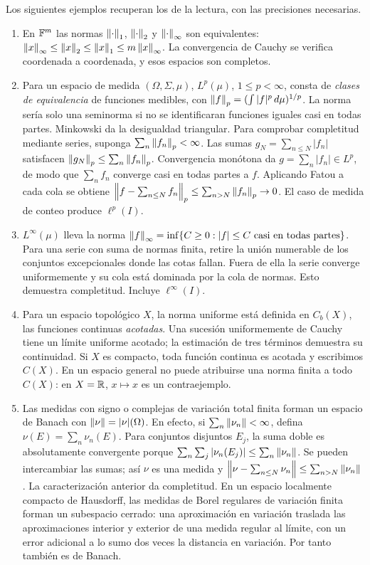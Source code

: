 Los siguientes ejemplos recuperan los de la lectura, con las precisiones necesarias.
\begin{enumerate}
\item En $\mathbb F^m$ las normas $\left\lVert\cdot\right\rVert_1$, $\left\lVert\cdot\right\rVert_2$ y $\left\lVert\cdot\right\rVert_\infty$ son equivalentes: $\left\lVert x\right\rVert_\infty\leq\left\lVert x\right\rVert_2\leq\left\lVert x\right\rVert_1\leq m\left\lVert x\right\rVert_\infty$. La convergencia de Cauchy se verifica coordenada a coordenada, y esos espacios son completos.
\item Para un espacio de medida $(\Omega,\Sigma,\mu)$, $L^p(\mu)$, $1\leq p<\infty$, consta de \emph{clases de equivalencia} de funciones medibles, con $\left\lVert f\right\rVert_p=(\int|f|^p\,d\mu)^{1/p}$. La norma sería solo una seminorma si no se identificaran funciones iguales casi en todas partes. Minkowski da la desigualdad triangular. Para comprobar completitud mediante series, suponga $\sum_n\left\lVert f_n\right\rVert_p<\infty$. Las sumas $g_N=\sum_{n\leq N}|f_n|$ satisfacen $\left\lVert g_N\right\rVert_p\leq\sum_n\left\lVert f_n\right\rVert_p$. Convergencia monótona da $g=\sum_n|f_n|\in L^p$, de modo que $\sum_nf_n$ converge casi en todas partes a $f$. Aplicando Fatou a cada cola se obtiene $\left\lVert f-\sum_{n\leq N}f_n\right\rVert_p\leq\sum_{n>N}\left\lVert f_n\right\rVert_p\to0$. El caso de medida de conteo produce $\ell^p(I)$.
\item $L^\infty(\mu)$ lleva la norma $\left\lVert f\right\rVert_\infty=\inf\{C\geq0:|f|\leq C\text{ casi en todas partes}\}$. Para una serie con suma de normas finita, retire la unión numerable de los conjuntos excepcionales donde las cotas fallan. Fuera de ella la serie converge uniformemente y su cola está dominada por la cola de normas. Esto demuestra completitud. Incluye $\ell^\infty(I)$.
\item Para un espacio topológico $X$, la norma uniforme está definida en $C_b(X)$, las funciones continuas \emph{acotadas}. Una sucesión uniformemente de Cauchy tiene un límite uniforme acotado; la estimación de tres términos demuestra su continuidad. Si $X$ es compacto, toda función continua es acotada y escribimos $C(X)$. En un espacio general no puede atribuirse una norma finita a todo $C(X)$: en $X=\mathbb R$, $x\mapsto x$ es un contraejemplo.
\item Las medidas con signo o complejas de variación total finita forman un espacio de Banach con $\left\lVert\nu\right\rVert=|\nu|(\Omega)$. En efecto, si $\sum_n\left\lVert\nu_n\right\rVert<\infty$, defina $\nu(E)=\sum_n\nu_n(E)$. Para conjuntos disjuntos $E_j$, la suma doble es absolutamente convergente porque $\sum_n\sum_j|\nu_n(E_j)|\leq\sum_n\left\lVert\nu_n\right\rVert$. Se pueden intercambiar las sumas; así $\nu$ es una medida y $\left\lVert\nu-\sum_{n\leq N}\nu_n\right\rVert\leq\sum_{n>N}\left\lVert\nu_n\right\rVert$. La caracterización anterior da completitud. En un espacio localmente compacto de Hausdorff, las medidas de Borel regulares de variación finita forman un subespacio cerrado: una aproximación en variación traslada las aproximaciones interior y exterior de una medida regular al límite, con un error adicional a lo sumo dos veces la distancia en variación. Por tanto también es de Banach.

\end{enumerate}
